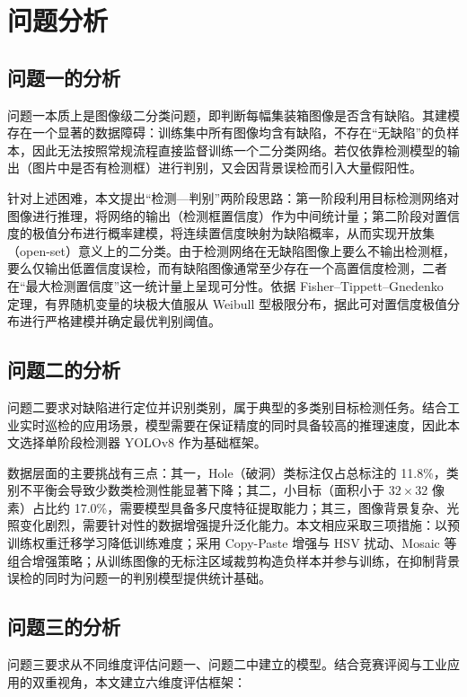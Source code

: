 \section{问题分析}

\subsection{问题一的分析}

问题一本质上是图像级二分类问题，即判断每幅集装箱图像是否含有缺陷。其建模存在一个显著的数据障碍：训练集中所有图像均含有缺陷，不存在“无缺陷”的负样本，因此无法按照常规流程直接监督训练一个二分类网络。若仅依靠检测模型的输出（图片中是否有检测框）进行判别，又会因背景误检而引入大量假阳性。

针对上述困难，本文提出“检测—判别”两阶段思路：第一阶段利用目标检测网络对图像进行推理，将网络的输出（检测框置信度）作为中间统计量；第二阶段对置信度的极值分布进行概率建模，将连续置信度映射为缺陷概率，从而实现开放集（open-set）意义上的二分类。由于检测网络在无缺陷图像上要么不输出检测框，要么仅输出低置信度误检，而有缺陷图像通常至少存在一个高置信度检测，二者在“最大检测置信度”这一统计量上呈现可分性。依据 Fisher--Tippett--Gnedenko 定理，有界随机变量的块极大值服从 Weibull 型极限分布，据此可对置信度极值分布进行严格建模并确定最优判别阈值。

\subsection{问题二的分析}

问题二要求对缺陷进行定位并识别类别，属于典型的多类别目标检测任务。结合工业实时巡检的应用场景，模型需要在保证精度的同时具备较高的推理速度，因此本文选择单阶段检测器 YOLOv8 作为基础框架。

数据层面的主要挑战有三点：其一，Hole（破洞）类标注仅占总标注的 11.8\%，类别不平衡会导致少数类检测性能显著下降；其二，小目标（面积小于 $32\times32$ 像素）占比约 17.0\%，需要模型具备多尺度特征提取能力；其三，图像背景复杂、光照变化剧烈，需要针对性的数据增强提升泛化能力。本文相应采取三项措施：以预训练权重迁移学习降低训练难度；采用 Copy-Paste 增强与 HSV 扰动、Mosaic 等组合增强策略；从训练图像的无标注区域裁剪构造负样本并参与训练，在抑制背景误检的同时为问题一的判别模型提供统计基础。

\subsection{问题三的分析}

问题三要求从不同维度评估问题一、问题二中建立的模型。结合竞赛评阅与工业应用的双重视角，本文建立六维度评估框架：

